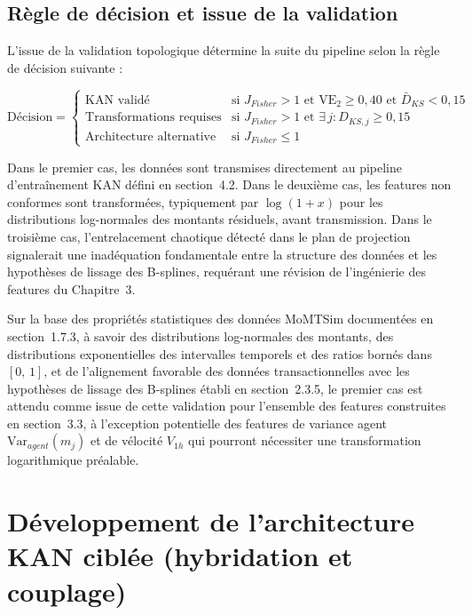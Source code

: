 \documentclass[11pt,a4paper,oneside]{report}
\theoremstyle{definition}
\theoremstyle{remark}
\begin{document}
\subsection{Règle de décision et issue de la validation}

L'issue de la validation topologique détermine la suite du pipeline selon la règle de décision suivante :

\begin{equation}
    \text{Décision} = \begin{cases}
        \text{KAN validé}
            & \text{si } J_{Fisher} > 1 \text{ et } \text{VE}_2 \geq 0{,}40 \text{ et } \bar{D}_{KS} < 0{,}15 \\[4pt]
        \text{Transformations requises}
            & \text{si } J_{Fisher} > 1 \text{ et } \exists\, j : D_{KS,j} \geq 0{,}15 \\[4pt]
        \text{Architecture alternative}
            & \text{si } J_{Fisher} \leq 1
    \end{cases}
\end{equation}

Dans le premier cas, les données sont transmises directement au pipeline d'entraînement KAN défini en section~4.2. Dans le deuxième cas, les features non conformes sont transformées, typiquement par $\log(1 + x)$ pour les distributions log-normales des montants résiduels, avant transmission. Dans le troisième cas, l'entrelacement chaotique détecté dans le plan de projection signalerait une inadéquation fondamentale entre la structure des données et les hypothèses de lissage des B-splines, requérant une révision de l'ingénierie des features du Chapitre~3.

Sur la base des propriétés statistiques des données MoMTSim documentées en section~1.7.3, à savoir des distributions log-normales des montants, des distributions exponentielles des intervalles temporels et des ratios bornés dans $[0,\,1]$, et de l'alignement favorable des données transactionnelles avec les hypothèses de lissage des B-splines établi en section~2.3.5, le premier cas est attendu comme issue de cette validation pour l'ensemble des features construites en section~3.3, à l'exception potentielle des features de variance agent $\text{Var}_{agent}(m_j)$ et de vélocité $V_{1h}$ qui pourront nécessiter une transformation logarithmique préalable.

\section{Développement de l'architecture KAN ciblée (hybridation et couplage)}
\end{document}
